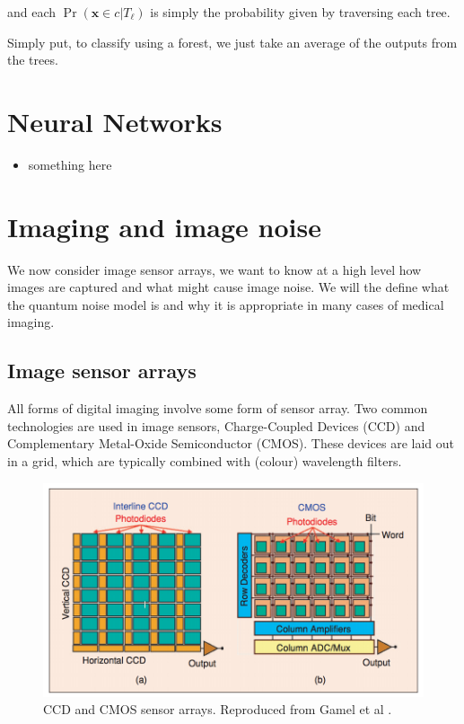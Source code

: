 \documentclass[12pt,twoside,notitlepage]{report}
\newcommand{\vc}[1]{\mathbf{#1}}
\begin{document}
            and each $\Pr(\vc{x} \in c | T_\ell)$ is simply the probability given by traversing each tree. \cite{criminisi2013decision}

            Simply put, to classify using a forest, we just take an average of the outputs from the trees. 





    \section{Neural Networks}
        \begin{itemize}
            \item something here
        \end{itemize}



    \section{Imaging and image noise} 
        We now consider image sensor arrays, we want to know at a high level how images are captured and what might 
        cause image noise. We will the define what the quantum noise model is and why it is appropriate in many 
        cases of medical imaging. 

        \subsection{Image sensor arrays}
            All forms of digital imaging involve some form of sensor array. Two common technologies are used in image 
            sensors, Charge-Coupled Devices (CCD) and Complementary Metal-Oxide Semiconductor (CMOS). These devices are 
            laid out in a grid, which are typically combined with (colour) wavelength filters. 

            \begin{figure}[H]
                \centering
                \includegraphics[scale=0.30]{sensor_arrays}
                \caption{CCD and CMOS sensor arrays. Reproduced from Gamel et al \cite{gamal2005cmos}.}
                \label{fig:image_pipeline}
            \end{figure}
\end{document}

